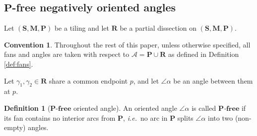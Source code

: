 \documentclass[a4paper,10pt]{amsart}
\theoremstyle{plain}          %
\newtheorem{lemma}[theorem]{Lemma}
\theoremstyle{definition}
\newtheorem{definition}[theorem]{Definition}
\newtheorem*{convention}{Convention}
\def\SS{\mathbf{S}}
\def\MM{\mathbf{M}}
\def\PP{\mathbf{P}}
\def\MM{\mathbf{M}}
\newcommand{\bR}{\mathbf{R}}
\newcommand{\ie}{{\em i.e.}\ }
\begin{document}
\subsection{$\mathbf{P}$-free negatively oriented angles}\label{ss:p-free negatively oriented angles}

Let $(\SS,\MM,\PP)$ be a tiling and let $\mathbf{R}$ be a partial dissection on $(\SS,\MM,\PP)$.
\begin{convention}\label{conv:arcs}
Throughout the rest of this paper, unless otherwise specified, all fans and angles are taken with respect to $\mathcal{A} = \PP \cup \mathbf{R}$ as defined in Definition \ref{def:fans}.
\end{convention}



Let $\gamma_1, \gamma_2\in\mathbf{R}$  share a common endpoint $p$, 
and let $\angle\alpha$ be an angle between them at $p$.



\begin{definition}[$\PP$-$\mathbf{free}$ oriented angle]
An oriented angle $\angle\alpha$ is called \emph{$\PP$-$\mathbf{free}$} if its fan contains no interior arcs from $\PP$, \ie no arc in $\PP$ splits  $\angle\alpha$  into two (non-empty) angles.
\end{definition}

    
\end{document}
